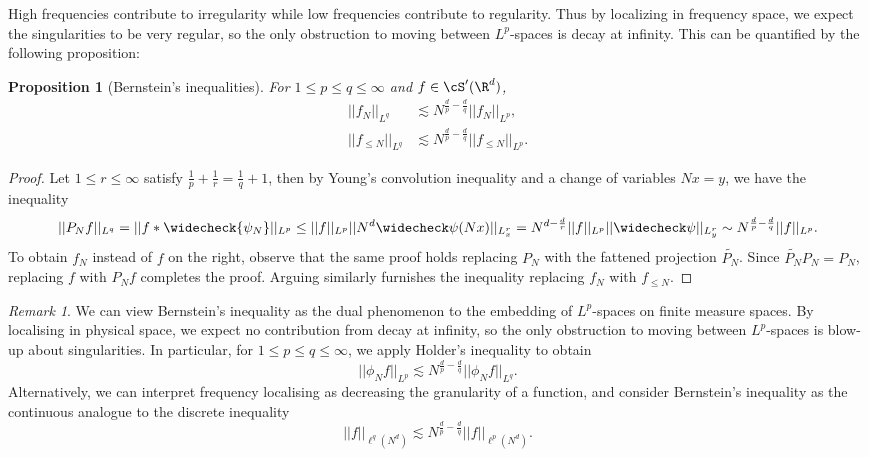 \documentclass[reqno]{amsart}
\newtheorem{proposition}[theorem]{Proposition}
\theoremstyle{definition}
\theoremstyle{remark}
\newtheorem*{remark}{Remark}
\begin{document}
High frequencies contribute to irregularity while low frequencies contribute to regularity. Thus by localizing in frequency space, we expect the singularities to be very regular, so the only obstruction to moving between $L^p$-spaces is decay at infinity. This can be quantified by the following proposition:

\begin{proposition}[Bernstein's inequalities]
	For $1 \leq p \leq q \leq \infty$ and $f \in \cS' (\R^d)$, 
	\begin{align*}
					||f_N||_{L^q} 
						&\lesssim N^{\frac{d}{p} - \frac{d}{q}} ||f_N||_{L^p}, \\
					||f_{\leq N}||_{L^q} 
						&\lesssim N^{\frac{d}{p} - \frac{d}{q}} ||f_{\leq N}||_{L^p}. 
				\end{align*}\label{prop:bernstein}
\end{proposition}

\begin{proof}
	Let $1 \leq r \leq \infty$ satisfy $\tfrac1p + \tfrac1r = \tfrac1q + 1$, then by Young's convolution inequality and a change of variables $Nx = y$, we have the inequality
	\begin{align*}
		|| P_N f ||_{L^q} = || f * \widecheck{\psi_N} ||_{L^p} \leq ||f||_{L^p} ||N^d \widecheck \psi(Nx)||_{L^r_x} = N^{d - \frac{d}{r}} ||f||_{L^p} ||\widecheck \psi ||_{L^r_y} \sim N^{\frac{d}{p} - \frac{d}{q}} ||f||_{L^p}.
	\end{align*}
	To obtain $f_N$ instead of $f$ on the right, observe that the same proof holds replacing $P_N$ with the fattened projection $\widetilde{P_N}$. Since $\widetilde{P_N} P_N = P_N$, replacing $f$ with $P_N f$ completes the proof. Arguing similarly furnishes the inequality replacing $f_N$ with $f_{\leq N}$. 
\end{proof}

\begin{remark}
	We can view Bernstein's inequality as the dual phenomenon to the embedding of $L^p$-spaces on finite measure spaces. By localising in physical space, we expect no contribution from decay at infinity, so the only obstruction to moving between $L^p$-spaces is blow-up about singularities. In particular, for $1 \leq p \leq q \leq \infty$, we apply Holder's inequality to obtain
		\[ ||\phi_N f||_{L^p} \lesssim N^{\frac{d}{p} - \frac{d}{q}} ||\phi_N f||_{L^q}. \]
	Alternatively, we can interpret frequency localising as decreasing the granularity of a function, and consider Bernstein's inequality as the continuous analogue to the discrete inequality 
		\[ ||f||_{\ell^q (N^d)} \lesssim N^{\frac{d}{p} - \frac{d}{q}} ||f||_{\ell^p (N^d)}. \]
\end{remark}
\end{document}
